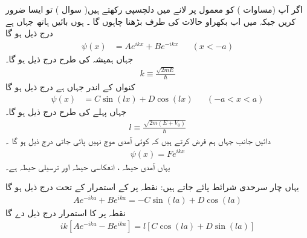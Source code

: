  اگر  آپ   (مساوات )   کو معمول پر لانے میں دلچسپی رکھتے ہیں( سوال  ) تو  ایسا ضرور کریں   جبکہ  میں اب بکھراو  حالات  کی طرف  بڑھنا چاہوں گا ۔  ہوں بائیں ہاتھ جہاں ہے درج ذیل ہو گا 
\begin{align}
\psi(x)&=Ae^{i k x}+Be^{-i k x} && (x<-a) 
\end{align}
 جہاں  ہمیشہ  کی طرح درج ذیل ہو گا۔
 \begin{align}
 k\equiv \frac{\sqrt{2mE}}{\hslash} 
 \end{align} 
  کنواں کے اندر جہاں  ہے درج ذیل ہو گا
\begin{align}
\psi(x)&=C\sin(lx)+D\cos(lx)&& (-a<x<a)
 \end{align}
 جہاں پہلے کی طرح درج ذیل ہو گا۔
  \begin{align}
  l\equiv \frac{\sqrt{2m(E+V_{0})}}{\hslash}
   \end{align}
     دائیں جانب جہاں ہم فرض کرتے ہیں کہ کوئی آمدی  موج نہیں پائی جاتی  درج ذیل ہو گا ۔
 \begin{align}
 \psi(x)=Fe^{i k x} 
 \end{align}
  یہاں  آمدی حیطہ ،  انعکاسی  حیطہ    اور ترسیلی  حیطہ    ہے۔ 
  
   یہاں چار سرحدی شرائط پائے جاتے ہیں:  نقطہ    پر    کے  استمرار   کے تحت  درج ذیل ہو گا
\begin{align}\label{مساوات_شروڈنگر_اے}
Ae^{-ika}+Be^{ika} = -C\sin(la)+D\cos(la)
 \end{align}
نقطہ  پر کا استمرار درج ذیل دے گا
\begin{align}\label{مساوات_شروڈنگر_اے_بی}
ik[Ae^{-ika}-Be^{ika}] =l[C\cos(la)+D\sin(la)] 
\end{align}

